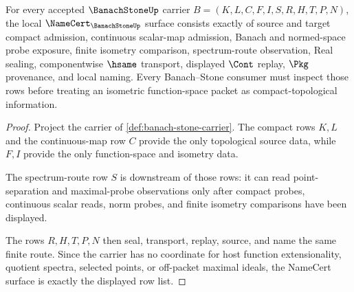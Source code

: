\begin{theorem}
\label{thm:banach-stone-namecert-obligations}
For every accepted $\BanachStoneUp$ carrier $B=(K,L,C,F,I,S,R,H,T,P,N)$, the local $\NameCert_{\BanachStoneUp}$ surface consists exactly of source and target compact admission, continuous scalar-map admission, Banach and normed-space probe exposure, finite isometry comparison, spectrum-route observation, Real sealing, componentwise $\hsame$ transport, displayed $\Cont$ replay, $\Pkg$ provenance, and local naming. Every Banach--Stone consumer must inspect those rows before treating an isometric function-space packet as compact-topological information.
\end{theorem}
\begin{proof}
Project the carrier of \autoref{def:banach-stone-carrier}. The compact rows $K,L$ and the continuous-map row $C$ provide the only topological source data, while $F,I$ provide the only function-space and isometry data.

The spectrum-route row $S$ is downstream of those rows: it can read point-separation and maximal-probe observations only after compact probes, continuous scalar reads, norm probes, and finite isometry comparisons have been displayed.

The rows $R,H,T,P,N$ then seal, transport, replay, source, and name the same finite route. Since the carrier has no coordinate for host function extensionality, quotient spectra, selected points, or off-packet maximal ideals, the NameCert surface is exactly the displayed row list.
\end{proof}

